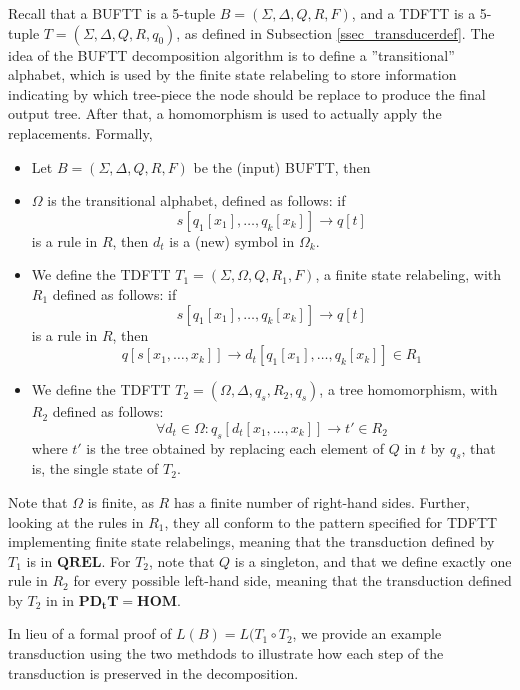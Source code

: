 Recall that a BUFTT is a 5-tuple $B = (\Sigma, \Delta, Q, R, F)$, and
a TDFTT is a 5-tuple $T = (\Sigma, \Delta, Q, R, q_0)$,
as defined in Subsection \ref{ssec_transducerdef}. The idea of the BUFTT
decomposition algorithm is to define a ''transitional'' alphabet, which
is used by the finite state relabeling to store information indicating by
which tree-piece the node should be replace to produce the final output
tree. After that, a homomorphism is used to actually apply the
replacements. Formally,

\begin{itemize}
\item Let $B = (\Sigma, \Delta, Q, R, F)$ be the (input) BUFTT, then

\item $\Omega$ is the transitional alphabet, defined as follows: if 
$$s[q_1[x_1],\ldots,q_k[x_k]] \rightarrow q[t]$$ is a rule in $R$, then
$d_{t}$ is a (new) symbol in $\Omega_k$.

\item We define the TDFTT $T_1 = (\Sigma, \Omega, Q, R_1, F)$, a
finite state relabeling, with $R_1$ defined as follows: if 
$$s[q_1[x_1],\ldots,q_k[x_k]] \rightarrow q[t]$$ is a rule in $R$, then
$$q[s[x_1,\ldots,x_k]] \rightarrow d_{t}[q_1[x_1],\ldots,q_k[x_k]] \in R_1$$

\item We define the TDFTT $T_2 = (\Omega, \Delta, {q_s}, R_2, {q_s})$, a tree
homomorphism, with $R_2$ defined as follows: $$\forall d_t \in \Omega:
q_s[d_t[x_1,\ldots,x_k]] \rightarrow t' \in R_2$$ where $t'$ is the tree obtained by
replacing each element of $Q$ in $t$ by $q_s$, that is, the single state of
$T_2$.
\end{itemize}

Note that $\Omega$ is finite, as $R$ has a finite number of right-hand
sides. Further, looking at the rules in $R_1$, they all conform to the
pattern specified for TDFTT implementing finite state relabelings, meaning
that the transduction defined by $T_1$ is in $\mathbf{QREL}$. For $T_2$,
note that $Q$ is a singleton, and that we define exactly one rule in $R_2$
for every possible left-hand side, meaning that the transduction defined by
$T_2$ in in $\mathbf{PD_tT = HOM}$.

In lieu of a formal proof of $L(B) = L(T_1 \circ T_2$, we provide an
example transduction using the two methdods to illustrate how each step of
the transduction is preserved in the decomposition.

